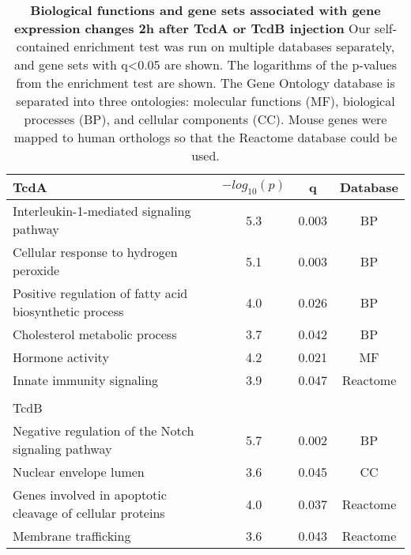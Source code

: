 \begin{table}[h!]
\begin{center}
\begin{tabular}{ l c c c }
TcdA & $-log_{10}(p)$ & q & Database \\ \hline
Interleukin-1-mediated signaling pathway & 5.3 & 0.003 & BP \\
Cellular response to hydrogen peroxide & 5.1 & 0.003 & BP \\
Positive regulation of fatty acid biosynthetic process & 4.0 & 0.026 & BP \\
Cholesterol metabolic process & 3.7 & 0.042 & BP \\
Hormone activity & 4.2 & 0.021 & MF \\
Innate immunity signaling & 3.9 & 0.047 & Reactome \\
 & & & \\
TcdB & & & \\ \hline
Negative regulation of the Notch signaling pathway & 5.7 & 0.002 & BP \\
Nuclear envelope lumen & 3.6 & 0.045 & CC \\
Genes involved in apoptotic cleavage of cellular proteins & 4.0 & 0.037 & Reactome \\
Membrane trafficking & 3.6 & 0.043 & Reactome \\
\end{tabular}
\caption[Biological functions and gene sets associated with gene 
         expression changes 2h after TcdA or TcdB injection]{
 \textbf{Biological functions and gene sets associated with 
 gene expression changes 2h after TcdA or TcdB injection}
Our self-contained enrichment test was run on multiple databases 
separately, and gene sets with q<0.05 are shown. The logarithms 
of the p-values from the enrichment test are shown. The Gene 
Ontology database is separated into three ontologies: molecular 
functions (MF), biological processes (BP), and cellular components (CC). 
Mouse genes were mapped to human orthologs so that the Reactome 
database could be used.}
\label{ini:table2}
\end{center}
\end{table}


